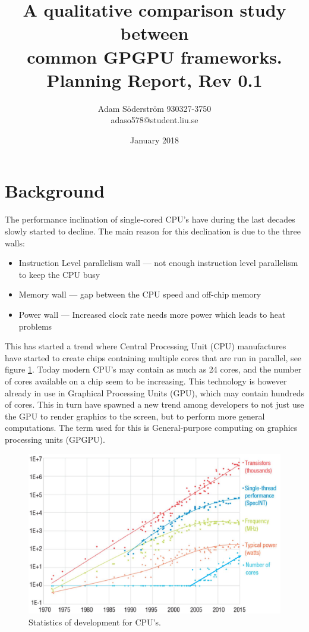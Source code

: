 \documentclass{article}
\title{%
  A qualitative comparison study between \\  
  common GPGPU frameworks. \\
  \large Planning Report, Rev 0.1 \\
}
\author{
    Adam Söderström 930327-3750 \\
    adaso578@student.liu.se 
}
\date{January 2018}
\begin{document}
\maketitle

\section{Background}
The performance inclination of single-cored CPU's have during the last decades slowly started to decline. The main reason for this declination is due to the three walls:

\begin{itemize}
    \item Instruction Level parallelism wall --- not enough instruction level parallelism to keep the CPU busy
    \item Memory wall --- gap between the CPU speed and off-chip memory
    \item Power wall --- Increased clock rate needs more power which leads to heat problems
\end{itemize}

\noindent This has started a trend where Central Processing Unit (CPU) manufactures have started to create chips containing multiple cores that are run in parallel, see figure \ref{fig:cpuStats}. Today modern CPU's may contain as much as 24 cores, and the number of cores available on a chip seem to be increasing. This technology is however already in use in Graphical Processing Units (GPU), which may contain hundreds of cores. This in turn have spawned a new trend among developers to not just use the GPU to render graphics to the screen, but to perform more general computations. The term used for this is General-purpose computing on graphics processing units (GPGPU).

\begin{figure}[!h]
    \centering
    \includegraphics[width=12cm]{Figs/CPUStats.png}
    \caption{Statistics of development for CPU's. \cite{CPUStats}}
    \label{fig:cpuStats}
\end{figure}
\end{document}
